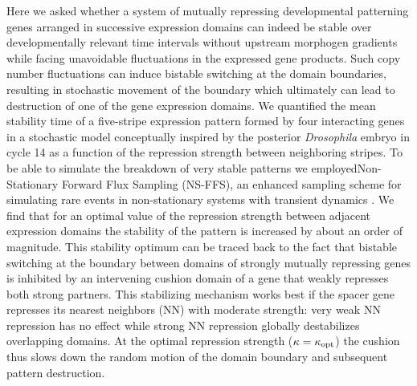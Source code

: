 \documentclass[a4paper,10pt]{article}
\newcommand{\Drosophila}{{\it Drosophila}\xspace}
\begin{document}
Here we asked whether a system of mutually repressing developmental patterning genes arranged in successive expression domains can indeed be stable over developmentally relevant time intervals without upstream morphogen gradients while facing unavoidable fluctuations in the expressed gene products. Such copy number fluctuations can induce bistable switching at the domain boundaries, resulting in stochastic movement of the boundary which ultimately can lead to destruction of one of the gene expression domains.
We quantified the mean stability time of a five-stripe expression pattern formed by four interacting genes
in a stochastic model conceptually inspired by the posterior \Drosophila embryo in cycle 14
as a function of the repression strength between neighboring stripes.
To be able to simulate the breakdown of very stable patterns we employedNon-Stationary Forward Flux Sampling (NS-FFS), an enhanced sampling scheme for simulating rare events in non-stationary systems with transient dynamics \cite{BeckerAllenTenWolde2012}.
We find that for an optimal value of the repression strength between adjacent expression domains 
the stability of the pattern is increased by about an order of magnitude. 
This stability optimum can be traced back to the fact that bistable switching at the boundary between domains of strongly mutually repressing genes is inhibited 
by an intervening cushion domain of a gene that weakly represses both strong partners. 
This stabilizing mechanism works best if the spacer gene represses its nearest neighbors (NN) with moderate strength: 
very weak NN repression has no effect while strong NN repression globally destabilizes overlapping domains.
At the optimal repression strength ($\kappa=\kappa_{\rm opt}$) the cushion thus slows down the random motion of the domain boundary and subsequent pattern destruction.
\end{document}
